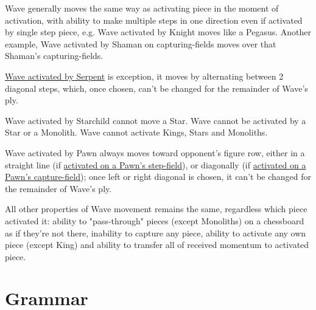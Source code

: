 Wave generally moves the same way as activating piece in the moment of activation,
with ability to make multiple steps in one direction even if activated by single
step piece, e.g. Wave activated by Knight moves like a Pegasus. Another example,
Wave activated by Shaman on capturing-fields moves over that Shaman's
capturing-fields.

\hyperref[fig:scn_tr_12_serpent_activating_wave]{Wave activated by Serpent} is
exception, it moves by alternating between 2 diagonal steps, which, once chosen,
can't be changed for the remainder of Wave's ply.

Wave activated by Starchild cannot move a Star.
Wave cannot be activated by a Star or a Monolith. Wave cannot activate Kings,
Stars and Monoliths.

Wave activated by Pawn always moves toward opponent's figure row, either in a
straight line (if
\hyperref[fig:scn_mv_20_wave_activation_by_step_pawn]{activated on a Pawn's step-field}),
or diagonally (if
\hyperref[fig:scn_mv_22_wave_activation_by_capture_pawn]{activated on a Pawn's capture-field});
once left or right diagonal is chosen, it can't be changed for the remainder of
Wave's ply.

All other properties of Wave movement remains the same, regardless which piece
activated it: ability to "pass-through" pieces (except Monoliths) on a chessboard
as if they're not there, inability to capture any piece, ability to activate any
own piece (except King) and ability to transfer all of received momentum to
activated piece.

\clearpage %

\section*{Grammar}
\label{sec:Appendix/Grammar}

